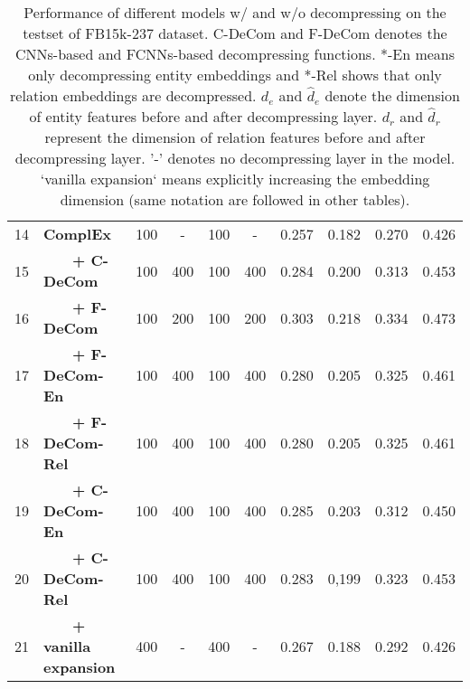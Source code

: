 \documentclass[letterpaper]{article} \usepackage{aaai20}  \usepackage{times}  \usepackage{helvet} \usepackage{courier}  \usepackage{booktabs}
\begin{document}
\begin{table*}[t]
\begin{tabular}{|c|l|cccc|cccc|}
         \midrule
         14 &\textbf{ComplEx} & 100 & - & 100 & - & 0.257 & 0.182 & 0.270& 0.426\\
         15 &~~~~\textbf{+ C-DeCom} & 100 & 400 & 100 & 400 & 0.284& 0.200& 0.313&  0.453\\
         16 &~~~~\textbf{+ F-DeCom} & 100 & 200 & 100 & 200 & 0.303 & 0.218 & 0.334 & 0.473\\
         17 &~~~~\textbf{+ F-DeCom-En} & 100 & 400 & 100 & 400 & 0.280 & 0.205 & 0.325 & 0.461\\
         18 &~~~~\textbf{+ F-DeCom-Rel}& 100 & 400 & 100 & 400 & 0.280 & 0.205 & 0.325 & 0.461\\
         19 &~~~~\textbf{+ C-DeCom-En} & 100 & 400 & 100 & 400 & 0.285 & 0.203 & 0.312 & 0.450\\
         20 &~~~~\textbf{+ C-DeCom-Rel} & 100 & 400 & 100 & 400 &0.283 & 0,199 & 0.323 & 0.453 \\
         21 &~~~~\textbf{+ vanilla expansion} & 400 & - & 400 & - & 0.267 & 0.188 & 0.292 & 0.426\\
        \bottomrule 
    \end{tabular}
    \caption{Performance of different models w/ and w/o decompressing on the testset of FB15k-237 dataset. C-DeCom and F-DeCom denotes the CNNs-based and FCNNs-based decompressing functions. *-En means only decompressing entity embeddings and *-Rel shows that only relation embeddings are decompressed. $d_e$ and $\hat{d}_{e}$ denote the dimension of entity features before and after decompressing layer. $d_r$ and $\hat{d}_{r}$ represent the dimension of relation features before and after decompressing layer. '-' denotes no decompressing layer in the model. `vanilla expansion` means explicitly increasing the embedding dimension (same notation are followed in other tables).}
    \label{tab:main_fb15k237}
\end{table*}
\end{document}
